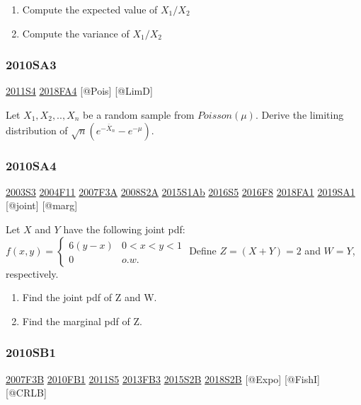 \documentclass[6pt,twocolumn,Portrait]{article}
\begin{document}
\begin{enumerate}
\def\labelenumi{(\alph{enumi})}
\item
  Compute the expected value of \(X_1/X_2\)
\item
  Compute the variance of \(X_1/X_2\)
\end{enumerate}

\hypertarget{sa3-1}{%
\subsubsection{2010SA3}\label{sa3-1}}

\protect\hyperlink{s4-2}{2011S4} \protect\hyperlink{fa4-4}{2018FA4}
{[}@Pois{]} {[}@LimD{]}

Let \(X_1,X_2,..,X_n\) be a random sample from \(Poisson(\mu)\). Derive
the limiting distribution of \(\sqrt{n}(e^{-\bar X_n}-e^{-\mu})\).

\hypertarget{sa4-1}{%
\subsubsection{2010SA4}\label{sa4-1}}

\protect\hyperlink{s3}{2003S3} \protect\hyperlink{f11}{2004F11}
\protect\hyperlink{f3a}{2007F3A} \protect\hyperlink{s2a}{2008S2A}
\protect\hyperlink{s1ab}{2015S1Ab} \protect\hyperlink{s5-4}{2016S5}
\protect\hyperlink{f8-4}{2016F8} \protect\hyperlink{fa1-4}{2018FA1}
\protect\hyperlink{sa1-3}{2019SA1} {[}@joint{]} {[}@marg{]}

Let \(X\) and \(Y\) have the following joint pdf:
\(f(x,y) =\begin{cases}6(y-x)& 0<x<y<1\\0& o.w.\end{cases}\) Define
\(Z=(X+Y)=2\) and \(W=Y\), respectively.

\begin{enumerate}
\def\labelenumi{(\alph{enumi})}
\item
  Find the joint pdf of Z and W.
\item
  Find the marginal pdf of Z.
\end{enumerate}

\hypertarget{sb1-1}{%
\subsubsection{2010SB1}\label{sb1-1}}

\protect\hyperlink{f3b}{2007F3B} \protect\hyperlink{fb1-1}{2010FB1}
\protect\hyperlink{s5-2}{2011S5} \protect\hyperlink{fb3-2}{2013FB3}
\protect\hyperlink{s2b-1}{2015S2B} \protect\hyperlink{s2b-2}{2018S2B}
{[}@Expo{]} {[}@FishI{]} {[}@CRLB{]}
\end{document}
